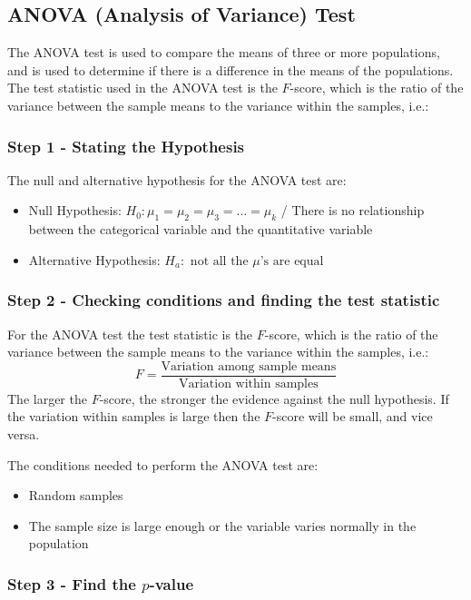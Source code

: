 \documentclass[12pt letter]{report}
\begin{document}
\subsection{ANOVA (Analysis of Variance) Test}

The ANOVA test is used to compare the means of three or more populations, and is used to determine if there is a
difference in the means of the populations. The test statistic used in the ANOVA test is the $F$-score, which is the ratio
of the variance between the sample means to the variance within the samples, i.e.:

\subsubsection{Step 1 - Stating the Hypothesis}

The null and alternative hypothesis for the ANOVA test are:
\begin{itemize}
  \item Null Hypothesis: $H_0: \mu_1 = \mu_2 = \mu_3 = \ldots = \mu_k$ / There is no relationship between the
        categorical variable and the quantitative variable
  \item Alternative Hypothesis: $H_a: \text{ not all the $\mu$'s are equal}$
\end{itemize}

\subsubsection{Step 2 - Checking conditions and finding the test statistic}

For the ANOVA test the test statistic is the $F$-score, which is the ratio of the variance between the sample means
to the variance within the samples, i.e.:
\[
  F = \frac{\text{Variation among sample means}}{\text{Variation within samples}}
\]
The larger the $F$-score, the stronger the evidence against the null hypothesis. If the variation within samples is
large then the $F$-score will be small, and vice versa.

The conditions needed to perform the ANOVA test are:
\begin{itemize}
  \item Random samples
  \item The sample size is large enough or the variable varies normally in the population
\end{itemize}

\subsubsection{Step 3 - Find the $p$-value}
\end{document}
